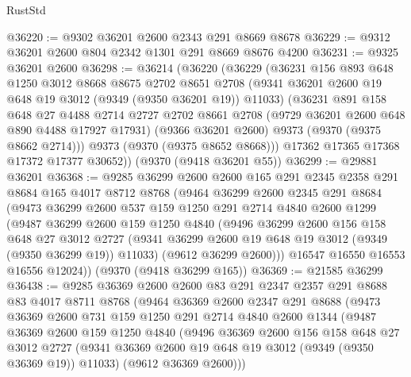 \begin{lexlean}{RustStd}
\begin{coremodule}
@36220 := @9302 @36201 @2600 @2343 @291 @8669 @8678
@36229 := @9312 @36201 @2600 @804 @2342 @1301 @291 @8669 @8676 @4200
@36231 := @9325 @36201 @2600
@36298 := @36214
    (@36220
      (@36229
        (@36231
          @156
          @893
          @648
          @1250
          @3012
          @8668
          @8675
          @2702
          @8651
          @2708
          (@9341 @36201 @2600 @19 @648 @19 @3012 (@9349 (@9350 @36201 @19)) @11033)
          (@36231
            @891
            @158
            @648
            @27
            @4488
            @2714
            @2727
            @2702
            @8661
            @2708
            (@9729 @36201 @2600 @648 @890 @4488 @17927 @17931)
            (@9366 @36201 @2600)
            @9373
            (@9370 (@9375 @8662 @2714)))
          @9373
          (@9370 (@9375 @8652 @8668)))
        @17362
        @17365
        @17368
        @17372
        @17377
        @30652))
    (@9370 (@9418 @36201 @55))
@36299 := @29881 @36201
@36368 := @9285
    @36299
    @2600
    @2600
    @165
    @291
    @2345
    @2358
    @291
    @8684
    @165
    @4017
    @8712
    @8768
    (@9464
      @36299
      @2600
      @2345
      @291
      @8684
      (@9473
        @36299
        @2600
        @537
        @159
        @1250
        @291
        @2714
        @4840
        @2600
        @1299
        (@9487
          @36299
          @2600
          @159
          @1250
          @4840
          (@9496
            @36299
            @2600
            @156
            @158
            @648
            @27
            @3012
            @2727
            (@9341 @36299 @2600 @19 @648 @19 @3012 (@9349 (@9350 @36299 @19)) @11033)
            (@9612 @36299 @2600)))
        @16547
        @16550
        @16553
        @16556
        @12024))
    (@9370 (@9418 @36299 @165))
@36369 := @21585 @36299
@36438 := @9285
    @36369
    @2600
    @2600
    @83
    @291
    @2347
    @2357
    @291
    @8688
    @83
    @4017
    @8711
    @8768
    (@9464
      @36369
      @2600
      @2347
      @291
      @8688
      (@9473
        @36369
        @2600
        @731
        @159
        @1250
        @291
        @2714
        @4840
        @2600
        @1344
        (@9487
          @36369
          @2600
          @159
          @1250
          @4840
          (@9496
            @36369
            @2600
            @156
            @158
            @648
            @27
            @3012
            @2727
            (@9341 @36369 @2600 @19 @648 @19 @3012 (@9349 (@9350 @36369 @19)) @11033)
            (@9612 @36369 @2600)))

\end{coremodule}
\end{lexlean}
